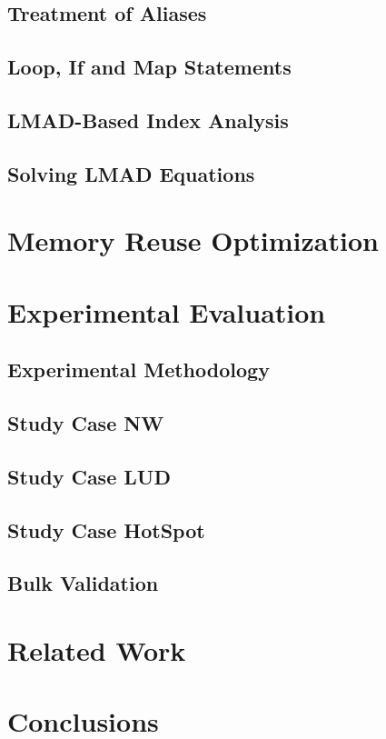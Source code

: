 \documentclass[conference]{IEEEtran}
\begin{document}
\subsection{Treatment of Aliases}
\label{subsec:shcirc-aliases}

\subsection{Loop, If and Map Statements}
\label{subsec:shcirc-aliases}

\subsection{LMAD-Based Index Analysis}
\label{subsec:idx-anl}

\subsection{Solving LMAD Equations}
\label{subsec:lmad-eqs}

\section{Memory Reuse Optimization}
\label{sec:regalloc}

\section{Experimental Evaluation}
\label{sec:exp-eval}

\subsection{Experimental Methodology}
\label{subsec:exp-meth}

\subsection{Study Case NW}
\label{subsec:exp-nw}

\subsection{Study Case LUD}
\label{subsec:exp-lud}

\subsection{Study Case HotSpot}
\label{subsec:exp-hotspot}

\subsection{Bulk Validation}
\label{subsec:bulk-val}

\section{Related Work}
\label{sec:rel-work}

\section{Conclusions}
\label{sec:concl}

\newpage



\end{document}
